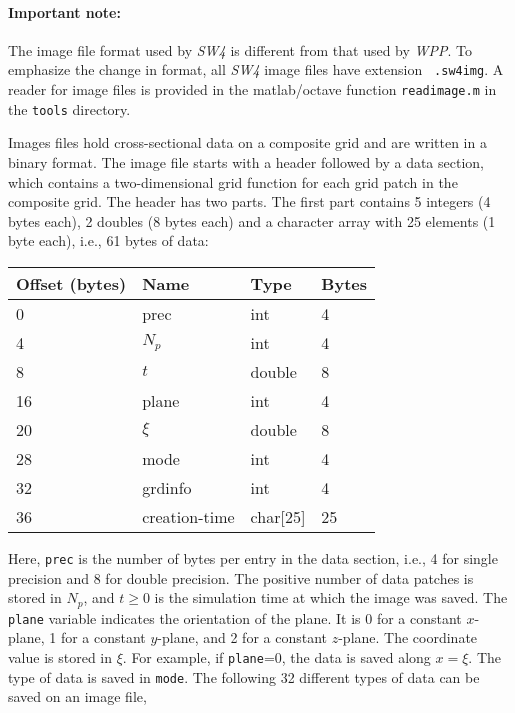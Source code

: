 \documentclass[11pt]{report}
\begin{document}
\paragraph{Important note:} The image file format used by \emph{SW4} is different from that used by
\emph{WPP}. To emphasize the change in format, all \emph{SW4} image files have extension {\tt
  .sw4img}. A reader for image files is provided in the matlab/octave function \verb+readimage.m+ in
the \verb+tools+ directory.

Images files hold cross-sectional data on a composite grid and are written in a binary format. The
image file starts with a header followed by a data section, which contains a two-dimensional grid
function for each grid patch in the composite grid. The header has two parts. The first part
contains 5 integers (4 bytes each), 2 doubles (8 bytes each) and a character array with 25 elements
(1 byte each), i.e., 61 bytes of data:
\begin{center}
\begin{tabular}{llll}\hline
Offset (bytes) & Name & Type & Bytes \\ \hline
0 & prec   & int & 4 \\ \hline
4 & $N_p$  & int & 4 \\ \hline
8 & $t$    & double & 8 \\ \hline
16 & plane & int & 4 \\ \hline
20 & $\xi$ & double & 8 \\ \hline
28 & mode  & int & 4 \\ \hline
32 & grdinfo & int & 4 \\ \hline
36 & creation-time & char[25] & 25 \\ \hline
\end{tabular}
\end{center}
Here, {\tt prec} is the number of bytes per entry in the data section, i.e., 4 for single precision
and 8 for double precision. The positive number of data patches is stored in $N_p$, and $t\geq 0$ is the
simulation time at which the image was saved. The {\tt plane} variable indicates the orientation of
the plane. It is 0 for a constant $x$-plane, 1 for a constant $y$-plane, and 2 for a constant
$z$-plane. The coordinate value is stored in $\xi$. For example, if {\tt plane}=0, the data is saved
along $x=\xi$. The type of data is saved in {\tt mode}. The following 32 different types of data can
be saved on an image file,
\end{document}
